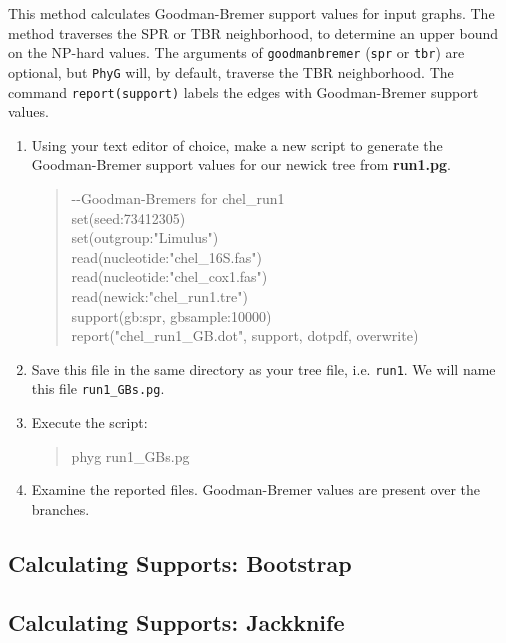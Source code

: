 \documentclass[]{article}
\newcommand{\phyg}{\texttt{PhyG} }
\begin{document}
This method calculates Goodman-Bremer support values for input graphs. The 
method traverses the SPR or TBR neighborhood, to determine an upper bound 
on the NP-hard values. The arguments of \texttt{goodmanbremer} (\texttt{spr} or 
\texttt{tbr}) are optional, but \phyg will, by default, traverse the TBR neighborhood. 
The command \texttt{report(support)} labels the edges with Goodman-Bremer support 
values.

\begin{enumerate}
 
 \item Using your text editor of choice, make a new script to generate the 
 Goodman-Bremer support values for our newick tree from \textbf{run1.pg}.
 
         \begin{quote}
	-\/-Goodman-Bremers for chel\_run1\\
	set(seed:73412305) \\
	set(outgroup:"Limulus") \\
	read(nucleotide:"chel\_16S.fas") \\
	read(nucleotide:"chel\_cox1.fas") \\
	read(newick:"chel\_run1.tre") \\
	support(gb:spr, gbsample:10000)\\
	report("chel\_run1\_GB.dot", support, dotpdf, overwrite)
        \end{quote}  
       
\item Save this file in the same directory as your tree file, i.e. \texttt{run1}.
We will name this file \texttt{run1\_GBs.pg}.

\item Execute the script:

	\begin{quote}
  	phyg run1\_GBs.pg
	\end{quote}
	
\item Examine the reported files. Goodman-Bremer values are present
over the branches.
         
\end{enumerate}

\subsection{Calculating Supports: Bootstrap}

\subsection{Calculating Supports: Jackknife}


\end{document}
